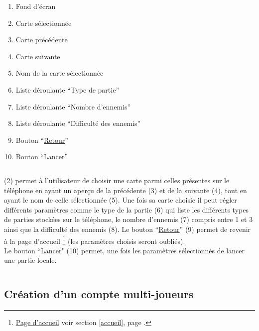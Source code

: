 \documentclass{report}
\begin{document}
		\begin{enumerate}
		  \item Fond d'écran
		  \item Carte sélectionnée
		  \item Carte précédente
		  \item Carte suivante
		  \item Nom de la carte sélectionnée
		  \item Liste déroulante ``Type de partie''
		  \item Liste déroulante ``Nombre d'ennemis''
		  \item Liste déroulante ``Difficulté des ennemis''
		  \item Bouton ``\hyperlink{Page d'accueil}{Retour}''
		  \item Bouton ``Lancer'' 
		\end{enumerate}
		
		$\,$
		
		(2) permet à l'utilisateur de choisir une carte parmi celles présentes sur le
		téléphone en ayant un aperçu de la précédente (3) et de la suivante (4), tout
		en ayant le nom de celle sélectionnée (5). Une fois sa carte choisie il peut 
		régler différents paramètres comme le type de la partie (6) qui liste les
		différents types de parties stockées sur le téléphone, le nombre d'ennemis (7)
		compris entre 1 et 3 ainsi que la difficulté des ennemis (8).
		Le bouton ``\hyperlink{Page d'accueil}{Retour}'' (9) permet de revenir à la page d'accueil%
		\footnote[1]{
			\hyperlink{Page d'accueil}{Page d'accueil}
			\og voir section \ref{accueil}, page \pageref{accueil}.\fg
		}
		(les paramètres choisis seront oubliés).\\
		Le bouton ``Lancer" (10) permet, une fois les paramètres sélectionnés de
		lancer une partie locale.
		
		$\,$
	
\newpage

	\subsection{Création d'un compte multi-joueurs}
	
		\hypertarget{Creation compte multi-joueurs}{}
		\label{Creation compte multi-joueurs}
	
		
		
\end{document}
